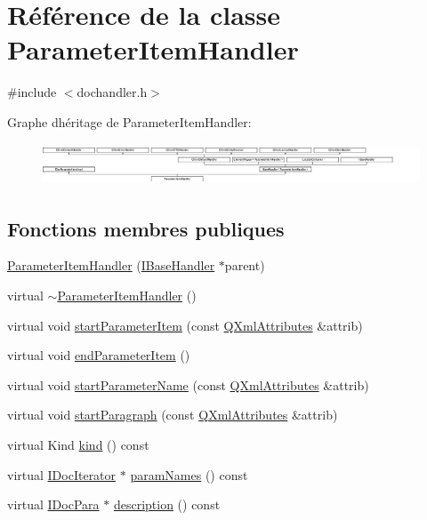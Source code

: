 \hypertarget{class_parameter_item_handler}{}\section{Référence de la classe Parameter\+Item\+Handler}
\label{class_parameter_item_handler}


{\ttfamily \#include $<$dochandler.\+h$>$}

Graphe d\textquotesingle{}héritage de Parameter\+Item\+Handler\+:\begin{figure}[H]
\begin{center}
\leavevmode
\includegraphics[height=1.245136cm]{class_parameter_item_handler}
\end{center}
\end{figure}
\subsection*{Fonctions membres publiques}
\begin{DoxyCompactItemize}
\item 
\hyperlink{class_parameter_item_handler_a4f3da4ca7c83c430d848ca33e2e22e07}{Parameter\+Item\+Handler} (\hyperlink{class_i_base_handler}{I\+Base\+Handler} $\ast$parent)
\item 
virtual \hyperlink{class_parameter_item_handler_a3680a481d38acf06c4eba711002786c1}{$\sim$\+Parameter\+Item\+Handler} ()
\item 
virtual void \hyperlink{class_parameter_item_handler_a64d1adb37b25641056b99832856c00ae}{start\+Parameter\+Item} (const \hyperlink{class_q_xml_attributes}{Q\+Xml\+Attributes} \&attrib)
\item 
virtual void \hyperlink{class_parameter_item_handler_aa0556ee54c289e8d2a323a7c59a08ea7}{end\+Parameter\+Item} ()
\item 
virtual void \hyperlink{class_parameter_item_handler_a3bda3c58f6e5ba7268c3d1ef5a62bc79}{start\+Parameter\+Name} (const \hyperlink{class_q_xml_attributes}{Q\+Xml\+Attributes} \&attrib)
\item 
virtual void \hyperlink{class_parameter_item_handler_ae9858c194425b51fc217c48ba684fdfa}{start\+Paragraph} (const \hyperlink{class_q_xml_attributes}{Q\+Xml\+Attributes} \&attrib)
\item 
virtual Kind \hyperlink{class_parameter_item_handler_a75cabaaa82247e488f0b24c573ba72c5}{kind} () const 
\item 
virtual \hyperlink{class_i_doc_iterator}{I\+Doc\+Iterator} $\ast$ \hyperlink{class_parameter_item_handler_a25d7c0d7c2e079357a5fcc9b8b99d7a8}{param\+Names} () const 
\item 
virtual \hyperlink{class_i_doc_para}{I\+Doc\+Para} $\ast$ \hyperlink{class_parameter_item_handler_a25eb1075c5692926cbb24d237fba8ffd}{description} () const 
\end{DoxyCompactItemize}
